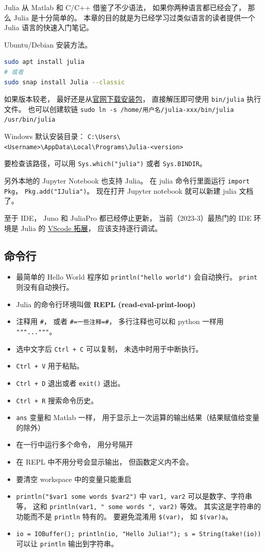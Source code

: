 
Julia 从 Matlab 和 C/C++ 借鉴了不少语法， 如果你两种语言都已经会了， 那么 Julia 是十分简单的。 本章的目的就是为已经学习过类似语言的读者提供一个 Julia 语言的快速入门笔记。

Ubuntu/Debian 安装方法。
\begin{lstlisting}[language=bash]
sudo apt install julia
# 或者
sudo snap install Julia --classic
\end{lstlisting}
如果版本较老， 最好还是从\href{https://julialang.org/downloads}{官网下载安装包}， 直接解压即可使用 \verb`bin/julia` 执行文件。 也可以创建软链 \verb`sudo ln -s /home/用户名/julia-xxx/bin/julia /usr/bin/julia`

Windows 默认安装目录： \verb`C:\Users\<Username>\AppData\Local\Programs\Julia-<version>`

要检查该路径，可以用 \verb`Sys.which("julia")` 或者 \verb`Sys.BINDIR`。

另外本地的 Jupyter Notebook 也支持 Julia。 在 julia 命令行里面运行 \verb`import Pkg`， \verb`Pkg.add("IJulia")`。 现在打开 Jupyter notebook 就可以新建 julia 文档了。

至于 IDE， Juno 和 JuliaPro 都已经停止更新， 当前（2023-3）最热门的 IDE 环境是 Julia 的 \href{https://www.julia-vscode.org}{VScode 拓展}， 应该支持逐行调试。

\subsection{命令行}
\begin{itemize}
\item 最简单的 Hello World 程序如 \verb`println("hello world")` 会自动换行。 \verb`print` 则没有自动换行。
\item Julia 的命令行环境叫做 \textbf{REPL (read-eval-print-loop)}
\item 注释用 \verb`#`， 或者 \verb`#=一些注释=#`， 多行注释也可以和 python 一样用 \verb`"""..."""`。
\item 选中文字后 \verb`Ctrl + C` 可以复制， 未选中时用于中断执行。
\item \verb`Ctrl + V` 用于粘贴。
\item \verb`Ctrl + D` 退出或者 \verb`exit()` 退出。
\item \verb`Ctrl + R` 搜索命令历史。
\item \verb`ans` 变量和 Matlab 一样， 用于显示上一次运算的输出结果（结果赋值给变量的除外）
\item 在一行中运行多个命令， 用分号隔开
\item 在 REPL 中不用分号会显示输出， 但函数定义内不会。
\item 要清空 workspace 中的变量只能重启
\item \verb`println("$var1 some words $var2")` 中 \verb`var1, var2` 可以是数字、字符串等， 这和 \verb`println(var1, " some words ", var2)` 等效。 其实这是字符串的功能而不是 \verb`println` 特有的。 要避免混淆用 \verb`$(var)`， 如 \verb`$(var)a`。
\item \verb`io = IOBuffer(); println(io, "Hello Julia!"); s = String(take!(io))` 可以让 \verb`println` 输出到字符串。
\end{itemize}


